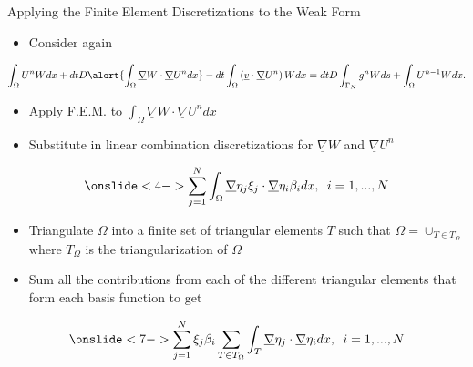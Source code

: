 \documentclass[10pt]{beamer}
\begin{document}
\begin{frame}{Applying the Finite Element Discretizations to the Weak Form} \label{applyingFEMtoweakform}
\begin{itemize}
\item<1-> Consider again
\end{itemize}
\footnotesize
\begin{equation}
\int_{\Omega}U^{n}W dx +dtD\alert{\int_{\Omega}\underline{\nabla}W \cdot \underline{\nabla} U^{n} dx}-dt\int_{\Omega}\left(\underline{v}\cdot \underline{\nabla}U^{n}\right)W dx=dtD\int_{\Gamma_{N}}g^{n}W ds+ \int_{\Omega} U^{n-1}W dx.
\end{equation}
\normalsize
\begin{itemize}
\item<2-> Apply F.E.M. to $\int_{\Omega}\underline{\nabla}W \cdot \underline{\nabla} U^{n} dx$
\end{itemize}

\begin{itemize}
\item <3-> Substitute in linear combination discretizations for $\underline{\nabla}W$ and $\underline{\nabla}U^{n}$
\end{itemize}

\begin{equation}\onslide<4->
\sum_{j=1}^{N} \int_{\Omega} \underline{\nabla}\eta_{j} \xi_{j} \cdot \underline{\nabla}\eta_{i} \beta_{i} dx, \texttt{ } i=1,...,N
\end{equation}

\begin{itemize}
\item Triangulate $\Omega$ into a finite set of triangular elements $T$ such that $\Omega = \cup_{T \in T_{\Omega}}$ where $T_{\Omega}$ is the triangularization of $\Omega$
\end{itemize}

\begin{itemize}
\item Sum all the contributions from each of the different triangular elements that form each basis function to get
\end{itemize}

\begin{equation}\onslide<7->
\sum_{j=1}^{N} \xi_{j}\beta_{i}\sum_{T \in T_{\Omega}}\int_{T} \underline{\nabla} \eta_{j} \cdot \underline{\nabla}\eta_{i} dx, \texttt{ } i=1,...,N
\end{equation}
\hyperlink{Questions}{}
\end{frame}
\end{document}
